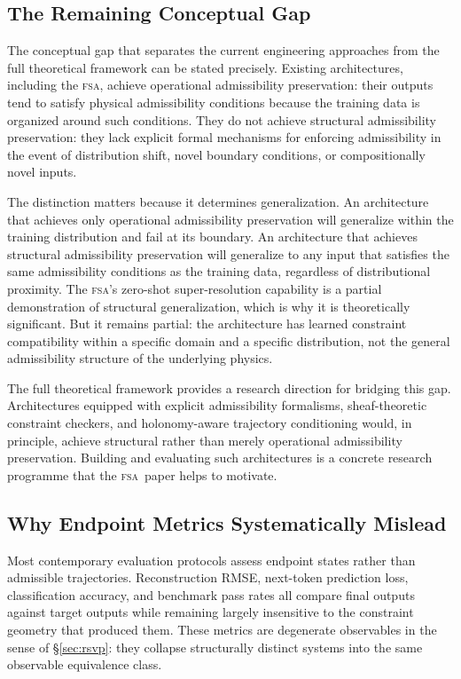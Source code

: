 \documentclass[11pt,a4paper]{article}
\theoremstyle{plain}
\theoremstyle{definition}
\theoremstyle{remark}
\newcommand{\FSA}{\textup{\textsc{fsa}}}
\begin{document}
\subsection{The Remaining Conceptual Gap}

The conceptual gap that separates the current engineering approaches from
the full theoretical framework can be stated precisely. Existing
architectures, including the \FSA, achieve operational admissibility
preservation: their outputs tend to satisfy physical admissibility
conditions because the training data is organized around such conditions.
They do not achieve structural admissibility preservation: they lack
explicit formal mechanisms for enforcing admissibility in the event of
distribution shift, novel boundary conditions, or compositionally novel
inputs.

The distinction matters because it determines generalization. An
architecture that achieves only operational admissibility preservation will
generalize within the training distribution and fail at its boundary. An
architecture that achieves structural admissibility preservation will
generalize to any input that satisfies the same admissibility conditions as
the training data, regardless of distributional proximity. The \FSA's
zero-shot super-resolution capability is a partial demonstration of
structural generalization, which is why it is theoretically significant.
But it remains partial: the architecture has learned constraint
compatibility within a specific domain and a specific distribution, not
the general admissibility structure of the underlying physics.

The full theoretical framework provides a research direction for bridging
this gap. Architectures equipped with explicit admissibility formalisms,
sheaf-theoretic constraint checkers, and holonomy-aware trajectory
conditioning would, in principle, achieve structural rather than merely
operational admissibility preservation. Building and evaluating such
architectures is a concrete research programme that the \FSA\ paper helps
to motivate.

\subsection{Why Endpoint Metrics Systematically Mislead}

Most contemporary evaluation protocols assess endpoint states rather than
admissible trajectories. Reconstruction RMSE, next-token prediction loss,
classification accuracy, and benchmark pass rates all compare final outputs
against target outputs while remaining largely insensitive to the constraint
geometry that produced them. These metrics are degenerate observables in the
sense of \S\ref{sec:rsvp}: they collapse structurally distinct systems into
the same observable equivalence class.
\end{document}
